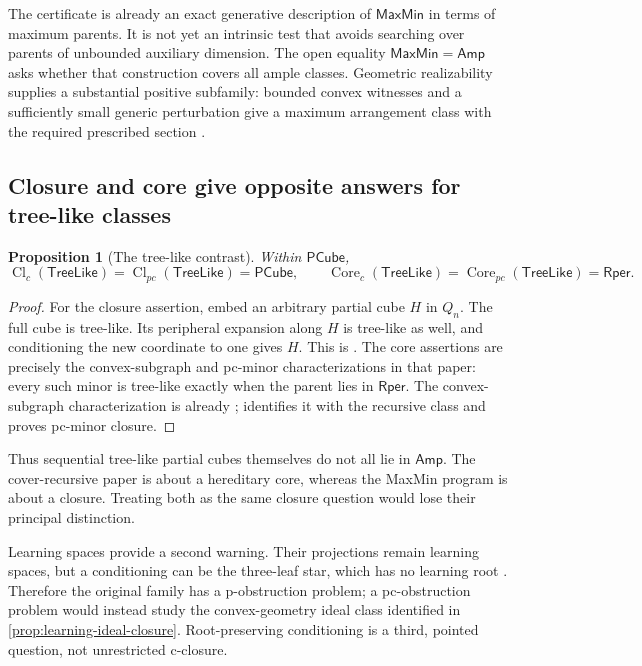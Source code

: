 \documentclass[11pt]{article}
\newtheorem{proposition}{Proposition}[section]
\theoremstyle{definition}
\newcommand{\Amp}{\mathsf{Amp}}
\newcommand{\MaxMin}{\mathsf{MaxMin}}
\newcommand{\Rper}{\mathsf{Rper}}
\newcommand{\PCube}{\mathsf{PCube}}
\newcommand{\Cl}{\operatorname{Cl}}
\newcommand{\Core}{\operatorname{Core}}
\begin{document}
The certificate is already an exact generative description of $\MaxMin$
in terms of maximum parents. It is not yet an intrinsic test that avoids
searching over parents of unbounded auxiliary dimension. The open equality
$\MaxMin=\Amp$ asks whether that construction covers all ample classes.
Geometric realizability supplies a substantial positive subfamily: bounded
convex witnesses and a sufficiently small generic perturbation give a maximum
arrangement class with the required prescribed section \cite{Geometry}.

\subsection{Closure and core give opposite answers for tree-like classes}

\begin{proposition}[The tree-like contrast]\label{prop:tree-like}
Within $\PCube$,
\[
 \Cl_c(\mathsf{TreeLike})=\Cl_{pc}(\mathsf{TreeLike})=\PCube,
 \qquad
 \Core_c(\mathsf{TreeLike})=\Core_{pc}(\mathsf{TreeLike})=\Rper.
\]
\end{proposition}
\begin{proof}
For the closure assertion, embed an arbitrary partial cube $H$ in $Q_n$.
The full cube is tree-like. Its peripheral expansion along $H$ is tree-like
as well, and conditioning the new coordinate to one gives $H$. This is
\cite[Remark on nonheredity]{Cover}. The core assertions are precisely the
convex-subgraph and pc-minor characterizations in that paper: every such
minor is tree-like exactly when the parent lies in $\Rper$. The
convex-subgraph characterization is already \cite[Proposition~5.6]{Polat};
\cite{Cover} identifies it with the recursive class and proves pc-minor closure.
\end{proof}

Thus sequential tree-like partial cubes themselves do not all lie in $\Amp$.
The cover-recursive paper is about a hereditary core, whereas the MaxMin
program is about a closure. Treating both as the same closure question would
lose their principal distinction.

Learning spaces provide a second warning. Their projections remain learning
spaces, but a conditioning can be the three-leaf star, which has no learning
root \cite[Proposition on the minor profile]{Learning}. Therefore the original
family has a p-obstruction problem; a pc-obstruction problem would instead
study the convex-geometry ideal class identified in
\cref{prop:learning-ideal-closure}. Root-preserving conditioning is a
third, pointed question, not unrestricted c-closure.
\end{document}
